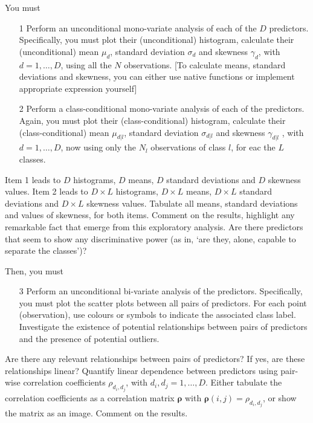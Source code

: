 \documentclass[a4paper,11pt]{article}
\begin{document}
\vskip0.25cm\noindent You must
\begin{enumerate}
\item[1] Perform an unconditional mono-variate analysis of each of the $D$ predictors. Specifically, you must plot their (unconditional) histogram, calculate their (unconditional) mean $\mu_d$, standard deviation $\sigma_d$ and skewness $\gamma_d$, with $d=1,\dots,D$, using all the $N$ observations. [To calculate means, standard deviations and skewness, you can either use native functions or implement appropriate expression yourself]
\item[2] Perform a class-conditional mono-variate analysis of each of the predictors. Again, you must plot their (class-conditional) histogram, calculate their (class-conditional) mean $\mu_{d|l}$, standard deviation $\sigma_{d|l}$ and skewness $\gamma_{d|l}$ , with $d=1,\dots,D$, now using only the $N_l$ observations of class $l$, for eac the $L$ classes.  
\end{enumerate}
\noindent Item 1 leads to $D$ histograms, $D$ means, $D$ standard deviations and $D$ skewness values. Item 2 leads to $D \times L$ histograms, $D \times L$ means, $D \times L$ standard deviations and $D \times L$ skewness values. Tabulate all means, standard deviations and values of skewness, for both items. Comment on the results, highlight any remarkable fact that emerge from this exploratory analysis. Are there predictors that seem to show any discriminative power (as in, `are they, alone, capable to separate the classes')?

\vskip0.25cm\noindent Then, you must
\begin{enumerate}
\item[3] Perform an unconditional bi-variate analysis of the predictors. Specifically, you must plot the scatter plots between all pairs of predictors. For each point (observation), use colours or symbols to indicate the associated class label. Investigate the existence of potential relationships between pairs of predictors and the presence of potential outliers.
\end{enumerate}
Are there any relevant relationships between pairs of predictors? If yes, are these relationships linear? Quantify linear dependence between predictors using pair-wise correlation coefficients $\rho_{d_i,d_j}$, with $d_i,d_j=1,\dots,D$. Either tabulate the correlation coefficients as a correlation matrix $\bm{\rho}$ with $\bm{\rho}(i,j) = \rho_{d_i,d_j}$, or show the matrix as an image. Comment on the results.
\end{document}
